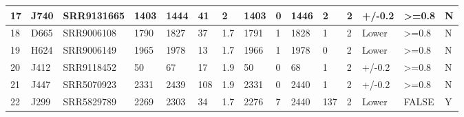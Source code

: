 \documentclass{article}
\begin{document}
{\begin{landscape}
\begin{table}[]
{\begin{tabular}{lllllllllllllll}
\multicolumn{1}{|l|}{17} & \multicolumn{1}{l|}{J740} & \multicolumn{1}{l|}{SRR9131665} & \multicolumn{1}{l|}{1403} & \multicolumn{1}{l|}{1444} & \multicolumn{1}{l|}{41} & \multicolumn{1}{l|}{2} & \multicolumn{1}{l|}{1403} & \multicolumn{1}{l|}{0} & \multicolumn{1}{l|}{1446} & \multicolumn{1}{l|}{2} & \multicolumn{1}{l|}{2} & \multicolumn{1}{l|}{+/-0.2} & \multicolumn{1}{l|}{\textgreater{}=0.8} & \multicolumn{1}{l|}{N} \\ \hline
\multicolumn{1}{|l|}{18} & \multicolumn{1}{l|}{D665} & \multicolumn{1}{l|}{SRR9006108} & \multicolumn{1}{l|}{1790} & \multicolumn{1}{l|}{1827} & \multicolumn{1}{l|}{37} & \multicolumn{1}{l|}{1.7} & \multicolumn{1}{l|}{1791} & \multicolumn{1}{l|}{1} & \multicolumn{1}{l|}{1828} & \multicolumn{1}{l|}{1} & \multicolumn{1}{l|}{2} & \multicolumn{1}{l|}{Lower} & \multicolumn{1}{l|}{\textgreater{}=0.8} & \multicolumn{1}{l|}{N} \\ \hline
\multicolumn{1}{|l|}{19} & \multicolumn{1}{l|}{H624} & \multicolumn{1}{l|}{SRR9006149} & \multicolumn{1}{l|}{1965} & \multicolumn{1}{l|}{1978} & \multicolumn{1}{l|}{13} & \multicolumn{1}{l|}{1.7} & \multicolumn{1}{l|}{1966} & \multicolumn{1}{l|}{1} & \multicolumn{1}{l|}{1978} & \multicolumn{1}{l|}{0} & \multicolumn{1}{l|}{2} & \multicolumn{1}{l|}{Lower} & \multicolumn{1}{l|}{\textgreater{}=0.8} & \multicolumn{1}{l|}{N} \\ \hline
\multicolumn{1}{|l|}{20} & \multicolumn{1}{l|}{J412} & \multicolumn{1}{l|}{SRR9118452} & \multicolumn{1}{l|}{50} & \multicolumn{1}{l|}{67} & \multicolumn{1}{l|}{17} & \multicolumn{1}{l|}{1.9} & \multicolumn{1}{l|}{50} & \multicolumn{1}{l|}{0} & \multicolumn{1}{l|}{68} & \multicolumn{1}{l|}{1} & \multicolumn{1}{l|}{2} & \multicolumn{1}{l|}{+/-0.2} & \multicolumn{1}{l|}{\textgreater{}=0.8} & \multicolumn{1}{l|}{N} \\ \hline
\multicolumn{1}{|l|}{21} & \multicolumn{1}{l|}{J447} & \multicolumn{1}{l|}{SRR5070923} & \multicolumn{1}{l|}{2331} & \multicolumn{1}{l|}{2439} & \multicolumn{1}{l|}{108} & \multicolumn{1}{l|}{1.9} & \multicolumn{1}{l|}{2331} & \multicolumn{1}{l|}{0} & \multicolumn{1}{l|}{2440} & \multicolumn{1}{l|}{1} & \multicolumn{1}{l|}{2} & \multicolumn{1}{l|}{+/-0.2} & \multicolumn{1}{l|}{\textgreater{}=0.8} & \multicolumn{1}{l|}{N} \\ \hline
\multicolumn{1}{|l|}{22} & \multicolumn{1}{l|}{J299} & \multicolumn{1}{l|}{SRR5829789} & \multicolumn{1}{l|}{2269} & \multicolumn{1}{l|}{2303} & \multicolumn{1}{l|}{34} & \multicolumn{1}{l|}{1.7} & \multicolumn{1}{l|}{2276} & \multicolumn{1}{l|}{7} & \multicolumn{1}{l|}{2440} & \multicolumn{1}{l|}{137} & \multicolumn{1}{l|}{2} & \multicolumn{1}{l|}{Lower} & \multicolumn{1}{l|}{FALSE} & \multicolumn{1}{l|}{Y} \\ \hline

\end{tabular}}
\end{table}
\end{landscape}}
\end{document}
